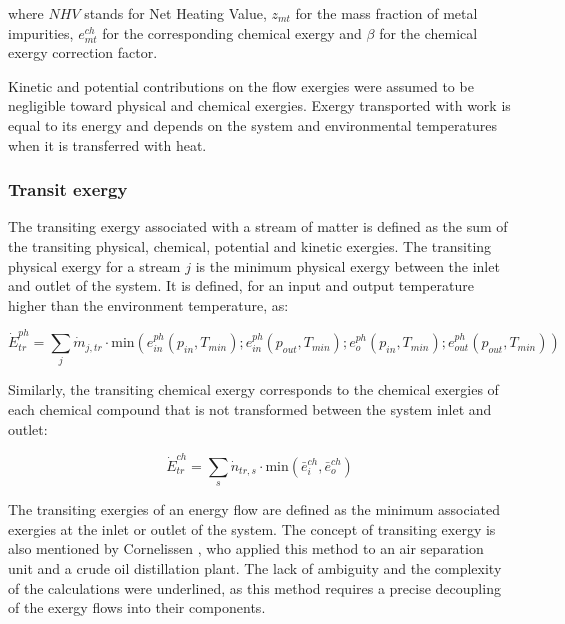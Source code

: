 	where $NHV$ stands for Net Heating Value, $z_{mt}$ for the mass fraction of metal impurities, $e^{ch}_{mt}$ for the corresponding chemical exergy and $\beta$ for the chemical exergy correction factor.

	
Kinetic and potential contributions on the flow exergies were assumed to be negligible toward physical and chemical exergies. Exergy transported with work is equal to its energy and depends on the system and environmental temperatures when it is transferred with heat.

\subsubsection{Transit exergy}

The transiting exergy associated with a stream of matter is defined as the sum of the transiting physical, chemical, potential and kinetic exergies. The transiting physical exergy for a stream $j$ is the minimum physical exergy between the inlet and outlet of the system. It is defined, for an input and output temperature higher than the environment temperature, as:

\begin{equation}
\dot{E}^{ph}_{tr} = \sum_j \dot{m}_{j,tr}\cdot\text{min}(e^{ph}_{in}(p_{in},T_{min});e_{in}^{ph}(p_{out},T_{min});e_{o}^{ph}(p_{in},T_{min});e_{out}^{ph}(p_{out},T_{min}))
\end{equation}

Similarly, the transiting chemical exergy corresponds to the chemical exergies of each chemical compound that is not transformed between the system inlet and outlet:

\begin{equation}
\dot{E}^{ch}_{tr} = \sum_s \dot{n}_{tr,s}\cdot\text{min}(\bar{e}^{ch}_i,\bar{e}^{ch}_o)
\end{equation}

The transiting exergies of an energy flow are defined as the minimum associated exergies at the inlet or outlet of the system. The concept of transiting exergy is also mentioned by Cornelissen \cite{Cornelissen1997}, who applied this method to an air separation unit and a crude oil distillation plant. The lack of ambiguity and the complexity of the calculations were underlined, as this method requires a precise decoupling of the exergy flows into their components.
	
